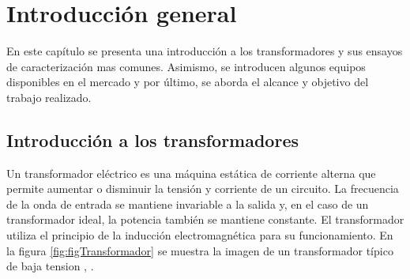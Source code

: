 
\chapter{Introducción general} %

\label{Chapter1} %
\label{IntroGeneral}


\newcommand{\keyword}[1]{\textbf{#1}}
\newcommand{\tabhead}[1]{\textbf{#1}}
\newcommand{\code}[1]{\texttt{#1}}
\newcommand{\file}[1]{\texttt{\bfseries#1}}
\newcommand{\option}[1]{\texttt{\itshape#1}}
\newcommand{\grados}{$^{\circ}$}

En este capítulo se presenta una introducción a los transformadores y sus ensayos de caracterización mas comunes. Asimismo, se introducen algunos equipos disponibles en el mercado y por último, se aborda el alcance y objetivo del trabajo realizado.



\section{Introducción a los transformadores}

Un transformador eléctrico es una máquina estática de corriente alterna que permite aumentar o disminuir la tensión y corriente de un circuito. La frecuencia de la onda de entrada se mantiene invariable a la salida y, en el caso de un transformador ideal, la potencia también se mantiene constante. El transformador utiliza el principio de la inducción electromagnética para su funcionamiento. En la figura \ref{fig:figTransformador} se muestra la imagen de un transformador típico de baja tension \citep{TRAFO_WIKI}, \citep{TRAFO_2}.

